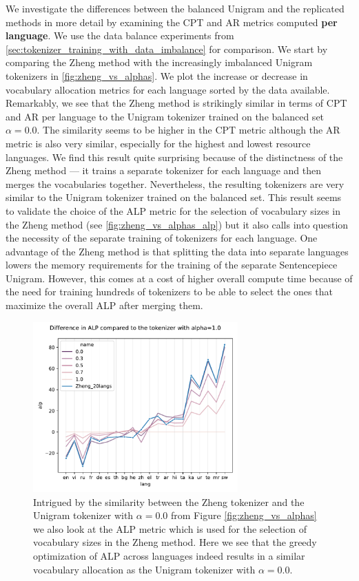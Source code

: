 We investigate the differences between the balanced Unigram and the replicated methods in more detail by examining the CPT and AR metrics computed \textbf{per language}. We use the data balance experiments from \autoref{sec:tokenizer_training_with_data_imbalance} for comparison. We start by comparing the Zheng method with the increasingly imbalanced Unigram tokenizers in \autoref{fig:zheng_vs_alphas}. We plot the increase or decrease in vocabulary allocation metrics for each language sorted by the data available. Remarkably, we see that the Zheng method is strikingly similar in terms of CPT and AR per language to the Unigram tokenizer trained on the balanced set $\alpha=0.0$. The similarity seems to be higher in the CPT metric although the AR metric is also very similar, especially for the highest and lowest resource languages. We find this result quite surprising because of the distinctness of the Zheng method --- it trains a separate tokenizer for each language and then merges the vocabularies together. Nevertheless, the resulting tokenizers are very similar to the Unigram tokenizer trained on the balanced set. This result seems to validate the choice of the ALP metric for the selection of vocabulary sizes in the Zheng method (see \autoref{fig:zheng_vs_alphas_alp}) but it also calls into question the necessity of the separate training of tokenizers for each language. One advantage of the Zheng method is that splitting the data into separate languages lowers the memory requirements for the training of the separate Sentencepiece Unigram. However, this comes at a cost of higher overall compute time because of the need for training hundreds of tokenizers to be able to select the ones that maximize the overall ALP after merging them.


\begin{figure}[H]
    \centering
    \includegraphics[width=0.7\textwidth]{figures/zheng_vs_alphas_alp.pdf}
    \caption{Intrigued by the similarity between the Zheng tokenizer and the Unigram tokenizer with $\alpha=0.0$ from Figure \ref{fig:zheng_vs_alphas} we also look at the ALP metric which is used for the selection of vocabulary sizes in the Zheng method. Here we see that the greedy optimization of ALP across languages indeed results in a similar vocabulary allocation as the Unigram tokenizer with $\alpha=0.0$.}
    \label{fig:zheng_vs_alphas_alp}
\end{figure}

